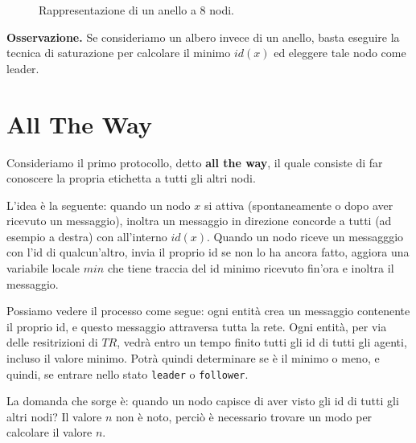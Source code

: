 \begin{figure}[htbp]
    \centering
    
    \caption{Rappresentazione di un anello a 8 nodi.}
    \label{fig:anello_nodi}
\end{figure}

\textbf{Osservazione.} Se consideriamo un albero invece di un anello, basta eseguire la tecnica di saturazione per calcolare il minimo $id(x)$ ed eleggere tale nodo come leader.

\section{All The Way}

Consideriamo il primo protocollo, detto \textbf{all the way}, il quale consiste di far conoscere la propria etichetta a tutti gli altri nodi.

L'idea è la seguente: quando un nodo $x$ si attiva (spontaneamente o dopo aver ricevuto un messaggio), inoltra un messaggio in direzione concorde a tutti (ad esempio a destra) con all'interno $id(x)$. Quando un nodo riceve un messagggio con l'id di qualcun'altro, invia il proprio id se non lo ha ancora fatto, aggiora una variabile locale $min$ che tiene traccia del id minimo ricevuto fin'ora e inoltra il messaggio. 

Possiamo vedere il processo come segue: ogni entità crea un messaggio contenente il proprio id, e questo messaggio attraversa tutta la rete. Ogni entità, per via delle resitrizioni di $TR$, vedrà entro un tempo finito tutti gli id di tutti gli agenti, incluso il valore minimo. Potrà quindi determinare se è il minimo o meno, e quindi, se entrare nello stato \texttt{leader} o \texttt{follower}. 

La domanda che sorge è: quando un nodo capisce di aver visto gli id di tutti gli altri nodi? Il valore $n$ non è noto, perciò è necessario trovare un modo per calcolare il valore $n$.

